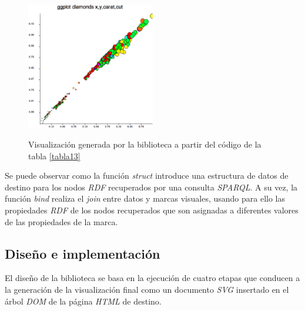 \begin{figure}
\vspace{2.4in}
\caption{Visualizaci\'on generada por la biblioteca a partir del c\'odigo de la tabla \ref{tabla13}}
\includegraphics[width=0.5\textwidth]{figura7}
\label{figura7}
\end{figure}

Se puede observar como la funci\'on \textit{struct} introduce una estructura de datos de destino para los nodos \textit{RDF} recuperados por una consulta \textit{SPARQL}. A su vez, la funci\'on \textit{bind} realiza el \textit{join} entre datos y marcas visuales, usando para ello las propiedades \textit{RDF} de los nodos recuperados que son asignadas a diferentes valores de las propiedades de la marca.

\subsection{Dise\~no e implementaci\'on}

El dise\~no de la biblioteca se basa en la ejecuci\'on de cuatro etapas que conducen a la generaci\'on de la visualizaci\'on final como un documento \textit{SVG} insertado en el \'arbol \textit{DOM} de la p\'agina \textit{HTML} de destino.

